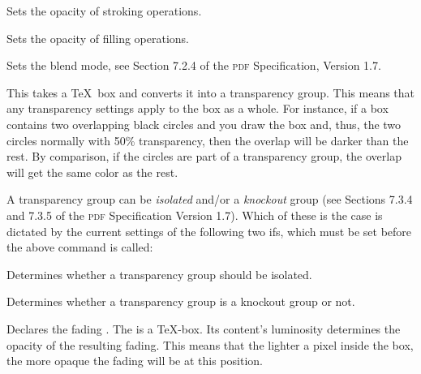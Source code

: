 \begin{command}{\pgfsys@stroke@opacity{}}
  Sets the opacity of stroking operations.
\end{command}

\begin{command}{\pgfsys@fill@opacity{}}
  Sets the opacity of filling operations.
\end{command}

\begin{command}{\pgfsys@blend@mode{}}
  Sets the blend mode, see Section 7.2.4 of the \textsc{pdf}
  Specification, Version 1.7.
\end{command}

\begin{command}{\pgfsys@transparencygroupfrombox{}}
  This takes a \TeX\ box and converts it into a transparency
  group. This means that any transparency settings apply to the box as
  a whole. For instance, if a box contains two overlapping black
  circles and you draw the box and, thus, the two circles normally
  with 50\% transparency, then the overlap will be darker than the
  rest. By comparison, if the circles are part of a transparency
  group, the overlap will get the same color as the rest.
\end{command}

A transparency group can be \emph{isolated} and/or a \emph{knockout}
group (see Sections 7.3.4 and 7.3.5 of the \textsc{pdf}
Specification Version 1.7). Which of these is the case is dictated
by the current settings of the following two ifs, which must be set
before the above command is called:
  
{\let\ifpgfsys@transparency@group@isolated=\relax
\begin{command}{\ifpgfsys@transparency@group@isolated}
  Determines whether a transparency group should be isolated. 
\end{command}
}

{\let\ifpgfsys@transparency@group@knockout=\relax
\begin{command}{\ifpgfsys@transparency@group@knockout}
  Determines whether a transparency group is a knockout group or not. 
\end{command}
}


  
\begin{command}{\pgfsys@fadingfrombox{}}
  Declares the fading . The  is a \TeX-box. Its
  content's luminosity determines the opacity of the resulting
  fading. This means that the lighter a pixel inside the box, the more
  opaque the fading will be at this position.
\end{command}

